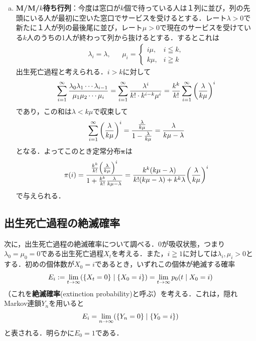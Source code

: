 \documentclass[dvipdfmx]{jsarticle}
\numberwithin{equation}{section}
\theoremstyle{definition}
\let\P\relax
\newcommand{\P}{\mathbb{P}}
\newcommand{\bpi}{\bm{\pi}}
\newcommand{\0}{\bm{0}}
\newcommand{\1}{\bm{1}}
\begin{document}
\begin{enumerate}[(a)]
  \item {\bf M/M/$k$待ち行列}：今度は窓口が$k$個で待っている人は１列に並び，列の先頭にいる人が最初に空いた窓口でサービスを受けるとする．レート$\lambda > 0$で新たに１人が列の最後尾に並び，レート$\mu > 0$で現在のサービスを受けている$k$人のうちの1人が終わって列から抜けるとする．するとこれは
  \begin{align}
    \lambda_i=\lambda, && \mu_i = \begin{cases} 
      i \mu, & i \leqq k, \\ 
      k \mu, & i \geqq k
    \end{cases}
  \end{align}
  出生死亡過程と考えられる．$i > k$に対して
  \begin{align}
    \sum_{i=1}^{\infty} \frac{\lambda_0 \lambda_1 \cdots \lambda_{i-1}}{\mu_1 \mu_2 \cdots \mu_i}
    = \sum_{i=1}^{\infty} \frac{\lambda^i}{k! \cdot k^{i-k} \mu^i} 
    = \frac{k^k}{k!} \sum_{i=1}^{\infty} \qty( \frac{\lambda}{k\mu} )^i
  \end{align}
  であり，この和は$\lambda < k \mu$で収束して
  \begin{align}
    \sum_{i=1}^{\infty} \qty( \frac{\lambda}{k \mu} )^i
    = \frac{\frac{\lambda}{k \mu}}{1 - \frac{\lambda}{k \mu}}
    = \frac{\lambda}{k \mu - \lambda}
  \end{align}
  となる．よってこのとき定常分布$\bpi$は
  \begin{align}
    \pi(i) = \frac{\frac{k^k}{k!} \qty( \frac{\lambda}{k \mu} )^i}{1 + \frac{k^k}{k!} \frac{\lambda}{k \mu - \lambda}} 
    = \frac{k^k (k \mu - \lambda)}{k! (k \mu - \lambda) + k^k \lambda} \qty( \frac{\lambda}{k\mu} )^i
  \end{align}
  で与えられる．
\end{enumerate}

\subsection{出生死亡過程の絶滅確率}
次に，出生死亡過程の絶滅確率について調べる．0が吸収状態，つまり$\lambda_0 = \mu_0 = 0$である出生死亡過程$X_t$を考える．また，$i \geqq 1$に対しては$\lambda_i, \mu_i > 0$とする．初めの個体数が$X_0 = i$であるとき，いずれこの個体が絶滅する確率
\begin{align}
  E_i := \lim_{t \to \infty} \P( \{X_t = 0\} \mid \{X_0 = i\} )
  = \lim_{t \to \infty} p_0(t \mid X_0 = i)
\end{align}
（これを{\bf 絶滅確率}(extinction probability)と呼ぶ）を考える．これは，隠れMarkov連鎖$Y_n$を用いると
\begin{align}
  E_i = \lim_{n \to \infty} \P( \{Y_n = 0\} \mid \{Y_0 = i\} )
\end{align}
と表される．明らかに$E_0 = 1$である．
\end{document}

